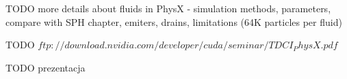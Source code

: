 TODO more details about fluids in PhysX - simulation methods, parameters, compare with SPH chapter, emiters, drains, limitations (64K particles per fluid)

TODO $ftp://download.nvidia.com/developer/cuda/seminar/TDCI_PhysX.pdf$

TODO prezentacja



